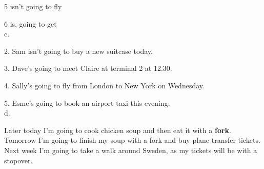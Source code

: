 \documentclass{article}
\begin{document}
5 isn't going to fly

6 is, going to get
\\
c.

2. Sam isn't going to buy a new suitcase
today.

3. Dave's going to meet Claire at terminal 2 at 12.30.

4. Sally's going to fly from London to New York on Wednesday.

5. Esme's going to book an airport taxi this evening.
\\
d.

Later today I'm going to cook chicken soup and then eat it with a \textbf{fork}. Tomorrow I'm going to finish my soup with a fork and buy plane transfer tickets. Next week I'm going to take a walk around Sweden, as my tickets will be with a stopover.
\end{document}
